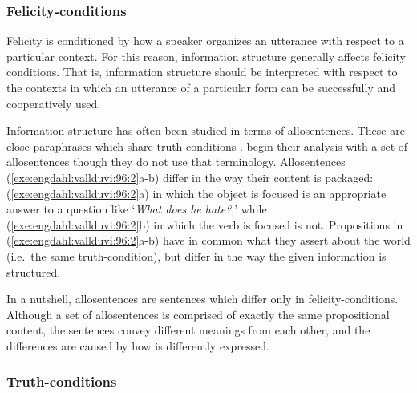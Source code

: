\subsubsection{Felicity-conditions}
\label{3:sssec:truth-condition:felicity-condition}



Felicity is conditioned by how a speaker organizes an utterance with
respect to a particular context. For this reason,
information structure generally affects felicity
conditions. That is, information structure
should be interpreted with respect to the contexts in which an
utterance of a particular form can be successfully and cooperatively
used.


Information structure has often been studied in terms of
allosentences. These are close paraphrases which share
truth-conditions \citep{lambrecht:96}.  \citet{engdahl:vallduvi:96}
begin their analysis with a set of allosentences though they do not
use that terminology. Allosentences
(\ref{exe:engdahl:vallduvi:96:2}a-b) differ in the way their content
is packaged: (\ref{exe:engdahl:vallduvi:96:2}a) in which the object is
focused is an appropriate answer to a question like `\textit{What does
  he hate?},' while (\ref{exe:engdahl:vallduvi:96:2}b) in which the
verb is focused is not. Propositions in
(\ref{exe:engdahl:vallduvi:96:2}a-b) have in common what they assert
about the world (i.e.\ the same truth-condition), but differ in the
way the given information is structured.


\noindent In a nutshell, allosentences are sentences which differ only
in felicity-conditions. Although a set of allosentences is comprised
of exactly the same propositional content, the sentences convey
different meanings from each other, and the differences are caused by
how  is differently expressed.




\subsubsection{Truth-conditions}
\label{3:sssec:focus-sensitivity}

